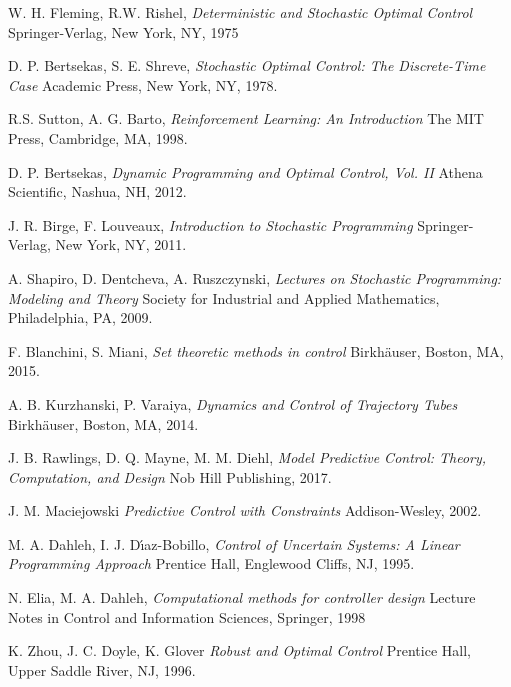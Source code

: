 \documentclass[letterpaper,11pt]{article}
\begin{document}
\begin{thebibliography}{1}

W. H. Fleming, R.W. Rishel, 
{\it Deterministic and Stochastic Optimal Control} 
Springer-Verlag, New York, NY, 1975

D. P. Bertsekas, S. E. Shreve,
{\it Stochastic Optimal Control: The Discrete-Time Case} 
Academic Press, New York, NY, 1978.


R.S. Sutton, A. G. Barto,
{\it Reinforcement Learning: An Introduction} 
The MIT Press, Cambridge, MA, 1998.

D. P. Bertsekas,
{\it Dynamic Programming and Optimal Control, Vol. II} 
Athena Scientific, Nashua, NH, 2012.

J. R. Birge, F. Louveaux, 
{\it Introduction to Stochastic Programming}
Springer-Verlag, New York, NY, 2011.

A. Shapiro, D. Dentcheva, A. Ruszczynski,
{\it Lectures on Stochastic Programming: Modeling and Theory}
Society for Industrial and Applied Mathematics, Philadelphia, PA, 2009.

F. Blanchini, S. Miani, 
{\it Set theoretic methods in control }
Birkh{\"a}user, Boston, MA, 2015.

A. B. Kurzhanski, P. Varaiya,
{\it Dynamics and Control of Trajectory Tubes}
Birkh{\"a}user, Boston, MA, 2014.

J. B. Rawlings, D. Q. Mayne, M. M. Diehl,
{\it Model Predictive Control: Theory, Computation, and Design}
Nob Hill Publishing, 2017.

J. M. Maciejowski
{\it Predictive Control with Constraints}
Addison-Wesley, 2002.


M. A. Dahleh, I. J. D{\'\i}az-Bobillo, 
{\it Control of Uncertain Systems: A Linear Programming Approach}  
Prentice Hall, Englewood Cliffs, NJ, 1995.

N. Elia, M. A. Dahleh, 
{\it Computational methods for controller design}  
Lecture Notes in Control and Information Sciences, Springer, 1998

K. Zhou, J. C. Doyle,  K. Glover 
{\it Robust and Optimal Control}  
Prentice Hall, Upper Saddle River, NJ, 1996.


\end{thebibliography}
\end{document}
